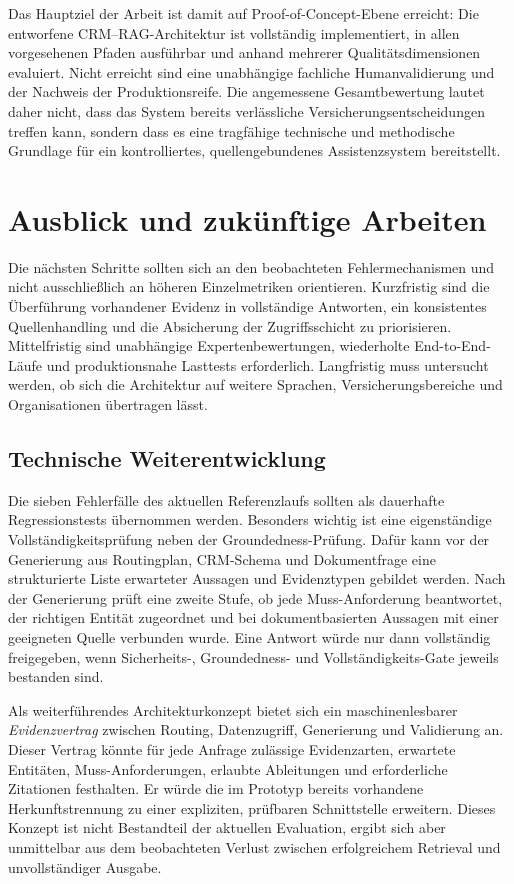 Das Hauptziel der Arbeit ist damit auf Proof-of-Concept-Ebene erreicht: Die entworfene CRM--RAG-Architektur ist vollständig implementiert, in allen vorgesehenen Pfaden ausführbar und anhand mehrerer Qualitätsdimensionen evaluiert. Nicht erreicht sind eine unabhängige fachliche Humanvalidierung und der Nachweis der Produktionsreife. Die angemessene Gesamtbewertung lautet daher nicht, dass das System bereits verlässliche Versicherungsentscheidungen treffen kann, sondern dass es eine tragfähige technische und methodische Grundlage für ein kontrolliertes, quellengebundenes Assistenzsystem bereitstellt.

\section{Ausblick und zukünftige Arbeiten}

Die nächsten Schritte sollten sich an den beobachteten Fehlermechanismen und nicht ausschließlich an höheren Einzelmetriken orientieren. Kurzfristig sind die Überführung vorhandener Evidenz in vollständige Antworten, ein konsistentes Quellenhandling und die Absicherung der Zugriffsschicht zu priorisieren. Mittelfristig sind unabhängige Expertenbewertungen, wiederholte End-to-End-Läufe und produktionsnahe Lasttests erforderlich. Langfristig muss untersucht werden, ob sich die Architektur auf weitere Sprachen, Versicherungsbereiche und Organisationen übertragen lässt.

\subsection{Technische Weiterentwicklung}

Die sieben Fehlerfälle des aktuellen Referenzlaufs sollten als dauerhafte Regressionstests übernommen werden. Besonders wichtig ist eine eigenständige Vollständigkeitsprüfung neben der Groundedness-Prüfung. Dafür kann vor der Generierung aus Routingplan, CRM-Schema und Dokumentfrage eine strukturierte Liste erwarteter Aussagen und Evidenztypen gebildet werden. Nach der Generierung prüft eine zweite Stufe, ob jede Muss-Anforderung beantwortet, der richtigen Entität zugeordnet und bei dokumentbasierten Aussagen mit einer geeigneten Quelle verbunden wurde. Eine Antwort würde nur dann vollständig freigegeben, wenn Sicherheits-, Groundedness- und Vollständigkeits-Gate jeweils bestanden sind.

Als weiterführendes Architekturkonzept bietet sich ein maschinenlesbarer \emph{Evidenzvertrag} zwischen Routing, Datenzugriff, Generierung und Validierung an. Dieser Vertrag könnte für jede Anfrage zulässige Evidenzarten, erwartete Entitäten, Muss-Anforderungen, erlaubte Ableitungen und erforderliche Zitationen festhalten. Er würde die im Prototyp bereits vorhandene Herkunftstrennung zu einer expliziten, prüfbaren Schnittstelle erweitern. Dieses Konzept ist nicht Bestandteil der aktuellen Evaluation, ergibt sich aber unmittelbar aus dem beobachteten Verlust zwischen erfolgreichem Retrieval und unvollständiger Ausgabe.

